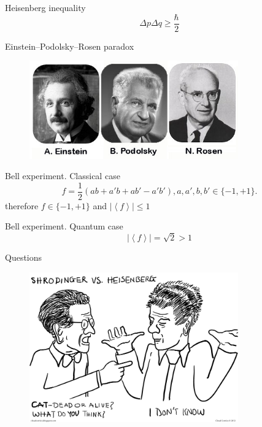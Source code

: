 \documentclass[10pt,pdf,hyperref={unicode}]{beamer}
\begin{document}
\begin{frame}{Heisenberg inequality}
  \[
  \Delta p \Delta q \ge \frac{\hbar}{2}
  \]
\end{frame}


\begin{frame}{Einstein–Podolsky–Rosen paradox}
 \begin{figure} 
   \includegraphics[width=90mm,scale=0.5]{epr.jpg}
  \end{figure}
\end{frame}

\begin{frame}{Bell experiment. Classical case}
\[
f = \frac{1}{2}\left(
a b + a' b + a b' - a' b'
\right), a,a',b,b' \in \{-1, +1\}.
\]
therefore
\(
f \in \{-1, +1\}
\)
and
\(
\left|\left<f\right>\right| \le 1
\)
\end{frame}

\begin{frame}{Bell experiment. Quantum case}
\[
\left|\left<f\right>\right| = \sqrt{2} > 1
\]
\end{frame}



\begin{frame}{Questions}
 \begin{figure} 
   \includegraphics[width=90mm,scale=0.5]{questions.png}
  \end{figure}
\end{frame}
\end{document}
